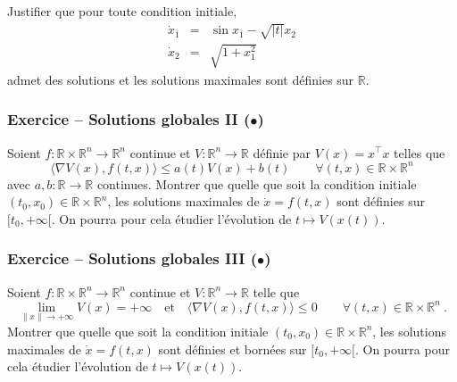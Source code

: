 Justifier que pour toute condition initiale,
\[
\begin{array}{rcl}
\dot{x}_1 &=& \sin x_1 - \sqrt{|t|} x_2 \\
\dot{x}_2 &=& \sqrt{1+x_1^2}
\end{array}
\] admet des solutions et les solutions maximales sont définies sur
\(\mathbb{R}\).

\hypertarget{glob_sol2}{%
\subsubsection*{\texorpdfstring{Exercice -- Solutions globales II
(\(\mathord{\bullet}\))}{Exercice -- Solutions globales II (•)}}\label{glob_sol2}}


Soient \(f:\mathbb{R}\times \mathbb{R}^n \to \mathbb{R}^n\) continue et
\(V:\mathbb{R}^n \to \mathbb{R}\) définie par \(V(x) = x^\top x\) telles
que \[
\langle\nabla V (x), f(t,x)\rangle \leq a(t) V(x) + b(t)  \qquad \forall (t,x)\in \mathbb{R}\times \mathbb{R}^n
\] avec \(a,b:\mathbb{R}\to \mathbb{R}\) continues. Montrer que quelle
que soit la condition initiale
\((t_0,x_0)\in \mathbb{R}\times \mathbb{R}^n\), les solutions maximales
de \(\dot{x} = f(t,x)\) sont définies sur \([t_0,+\infty[\). On pourra
pour cela étudier l'évolution de \(t\mapsto V(x(t))\).

\hypertarget{glob_sol3}{%
\subsubsection*{\texorpdfstring{Exercice -- Solutions globales III
(\(\mathord{\bullet}\))}{Exercice -- Solutions globales III (•)}}\label{glob_sol3}}


Soient \(f:\mathbb{R}\times \mathbb{R}^n \to \mathbb{R}^n\) continue et
\(V:\mathbb{R}^n \to \mathbb{R}\) telle que \[
\lim_{\|x\| \to +\infty} V(x) = +\infty \quad \text{et} \quad \langle\nabla V(x), f(t,x)\rangle \leq 0  \qquad \forall (t,x)\in \mathbb{R}\times \mathbb{R}^n \ .
\] Montrer que quelle que soit la condition initiale
\((t_0,x_0)\in \mathbb{R}\times \mathbb{R}^n\), les solutions maximales
de \(\dot{x} = f(t,x)\) sont définies et bornées sur \([t_0,+\infty[\).
On pourra pour cela étudier l'évolution de \(t\mapsto V(x(t))\).

